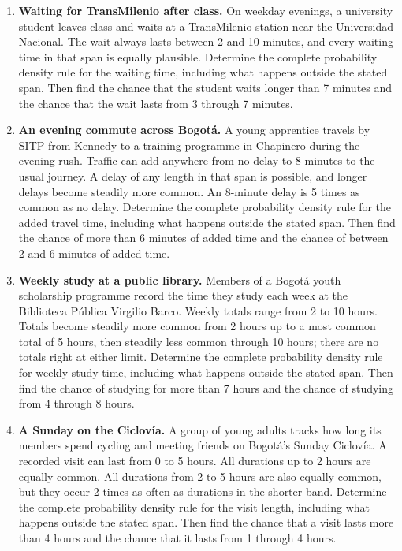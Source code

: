 	\begin{enumerate}[
		leftmargin=*,
		itemsep=2pt,
		parsep=0pt,
		topsep=2pt
		]
		
		\item \textbf{Waiting for TransMilenio after class.} On weekday evenings,
		a university student leaves class and waits at a TransMilenio station near
		the Universidad Nacional. The wait always lasts between 2 and 10
		minutes, and every waiting time in that span is equally plausible.
		Determine the complete probability density rule for the waiting time,
		including what happens outside the stated span. Then find the chance that
		the student waits longer than 7 minutes and the chance that the wait
		lasts from 3 through 7 minutes.
		
		\item \textbf{An evening commute across Bogot\'a.} A young apprentice
		travels by SITP from Kennedy to a training programme in Chapinero during
		the evening rush. Traffic can add anywhere from no delay to 8 minutes
		to the usual journey. A delay of any length in that span is possible, and
		longer delays become steadily more common. An 8-minute delay is 5
		times as common as no delay. Determine the complete probability density
		rule for the added travel time, including what happens outside the stated
		span. Then find the chance of more than 6 minutes of added time and the
		chance of between 2 and 6 minutes of added time.
		
		\item \textbf{Weekly study at a public library.} Members of a Bogot\'a
		youth scholarship programme record the time they study each week at the
		Biblioteca P\'ublica Virgilio Barco. Weekly totals range from 2 to 10
		hours. Totals become steadily more common from 2 hours up to a most
		common total of 5 hours, then steadily less common through 10 hours;
		there are no totals right at either limit. Determine the complete
		probability density rule for weekly study time, including what happens
		outside the stated span. Then find the chance of studying for more than
		7 hours and the chance of studying from 4 through 8 hours.
		
		\item \textbf{A Sunday on the Ciclov\'ia.} A group of young adults tracks
		how long its members spend cycling and meeting friends on Bogot\'a's Sunday
		Ciclov\'ia. A recorded visit can last from 0 to 5 hours. All
		durations up to 2 hours are equally common. All durations from 2 to
		5 hours are also equally common, but they occur 2 times as often as
		durations in the shorter band. Determine the complete probability density
		rule for the visit length, including what happens outside the stated span.
		Then find the chance that a visit lasts more than 4 hours and the chance
		that it lasts from 1 through 4 hours.
		

\end{enumerate}
